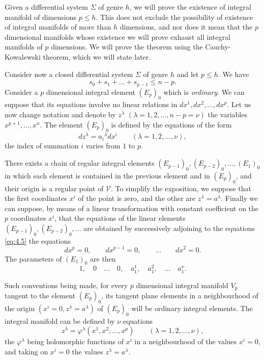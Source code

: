 \fsec Given a differential system $\Sigma$ of genre $h$, we will prove the existence of integral manifold of dimensions $p\le h$. This does not exclude the possibility of existence of integral manifolds of more than $h$ dimensions, and nor does it mean that the $p$ dimensional manifolds whose existence  we will prove exhaust all integral manifolds of $p$ dimensions. We will prove the theorem using the Cauchy-Kowalewski theorem, which we will state later.


\vspace{12pt}\fsec Consider now a closed differential system $\Sigma$ of genre $h$ and let $p\le h$. We have
\[
s_{0}+s_{1}+\dots+s_{p-1}\le n-p.
\]
Consider a $p$ dimensional integral element $(E_{p})_{0}$ which is \emph{ordinary}. We can suppose that its equations involve no linear relations in $dx^{1},dx^{2},\dots,dx^{p}$. Let us now change  notation and denote by $z^{\lambda}$ $(\lambda=1,2,\dots,n-p=\nu)$ the variables $x^{p+1},\dots,x^{n}$. The element $(E_{p})_{0}$ is defined by the equations of the form
\begin{equation}
  \label{eq:4.6}
  dz^{\lambda}=a_{i}{}^{\lambda}dx^{i}\qquad(\lambda=1,2,\dots,\nu),
\end{equation}
the index of summation $i$ varies from $1$ to $p$.

There exists a chain of regular integral elements $(E_{p-1})_{0},(E_{p-2})_{0},\dots,(E_{1})_{0}$ in which each element is contained in the previous element and in $(E_{p})_{0}$, and their origin is a regular point of $\mathcal{V}$. To simplify the exposition, we suppose that the first coordinates $x^{i}$ of the point is zero, and the other are $z^{\lambda}=a^{\lambda}$. Finally we can suppose, by means of a linear transformation with constant coefficient on the $p$ coordinates $x^{i}$, that the equations of the linear elements $(E_{p-1})_{0},(E_{p-2})_{0},\dots$ are obtained by successively adjoining to the equations \eqref{eq:4.5} the equations
\[
dx^{p}=0,\qquad dx^{p-1}=0,\qquad\dots\qquad dx^{2}=0.
\]
The parameters of $(E_{1})_{0}$ are then
\[
1,\quad 0\quad\dots\quad 0,\quad a^{1}_{1},\quad a^{2}_{1},\quad\dots\quad a^{\nu}_{1}.
\]

Such conventions being made, for every $p$ dimensional integral manifold $V_{p}$ tangent to the element $(E_{p})_{0}$, its tangent plane elements in a neighbourhood of the origin $(x^{i}=0,z^{\lambda}=a^{\lambda})$ of $(E_{p})_{0}$ will be ordinary integral elements. The integral manifold can be defined by $\nu$ equations
\begin{equation}
  \label{eq:4.7}
  z^{\lambda}=\varphi^{\lambda}(x^{1},x^{2},\dots,x^{p})\qquad (\lambda=1,2,\dots,\nu),
\end{equation}
the $\varphi^{\lambda}$ being holomorphic functions of $x^{i}$ in a neighbourhood of the values $x^{i}=0$, and taking on $x^{i}=0$ the values $z^{\lambda}=a^{\lambda}$.

